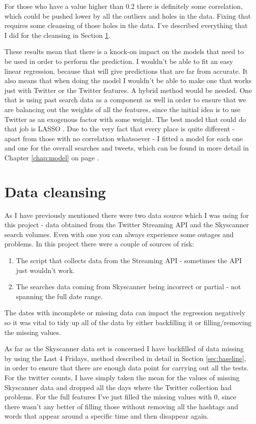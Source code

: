 \documentclass[minf,twoside,singlespacing,parskip,frontabs]{infthesis}
\begin{document}
For those who have a value higher than 0.2 there is definitely some correlation, which could be pushed lower by all the outliers and holes in the data. Fixing that requires some cleansing of those holes in the data. I've described everything that I did for the cleansing in Section \ref{sec:cleansing}.


These results mean that there is a knock-on impact on the models that need to be used in order to perform the prediction. I wouldn't be able to fit an easy linear regression, because that will give predictions that are far from accurate. It also means that when doing the model I wouldn't be able to make one that works just with Twitter or the Twitter features. A hybrid method would be needed. One that is using past search data as a component as well in order to ensure that we are balancing out the weights of all the features, since the initial idea is to use Twitter as an exogenous factor with some weight. The best model that could do that job is LASSO \cite{lasso}. Due to the very fact that every place is quite different - apart from those with no correlation whatsoever - I fitted a model for each one and one for the overall searches and tweets, which can be found in more detail in Chapter \ref{chap:model} on page \pageref{chap:model}.


\section{Data cleansing}
\label{sec:cleansing}


As I have previously mentioned there were two data source which I was using for this project - data obtained from the Twitter Streaming API and the Skyscanner search volumes. Even with one you can always experience some outages and problems. In this project there were a couple of sources of risk:
\begin{enumerate}
\item The script that collects data from the Streaming API - sometimes the API just wouldn't work. 
\item The searches data coming from Skyscanner being incorrect or partial - not spanning the full date range.
\end{enumerate}


The dates with incomplete or missing data can impact the regression negatively so it was vital to tidy up all of the data by either backfilling it or filling/removing the missing values. 

As far as the Skyscanner data set is concerned I have backfilled of data missing by using the Last 4 Fridays, method described in detail in Section \ref{sec:baseline}, in order to ensure that there are enough data point for carrying out all the tests. For the twitter counts, I have simply taken the mean for the values of missing Skyscanner data and dropped all the days where the Twitter collection had problems. For the full features I've just filled the missing values with 0, since there wasn't any better of filling those without removing all the hashtags and words that appear around a specific time and then disappear again.
\end{document}
